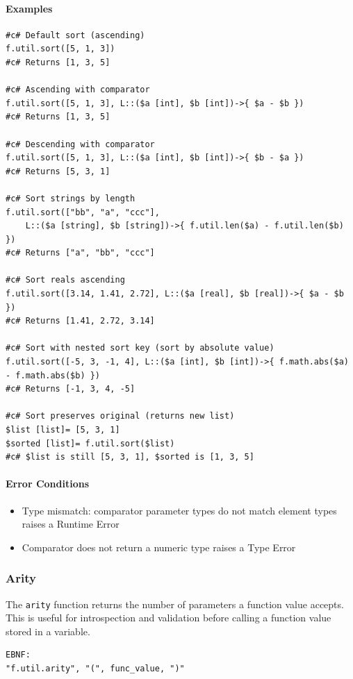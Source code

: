 \paragraph{Examples}
\begin{verbatim}
#c# Default sort (ascending)
f.util.sort([5, 1, 3])
#c# Returns [1, 3, 5]

#c# Ascending with comparator
f.util.sort([5, 1, 3], L::($a [int], $b [int])->{ $a - $b })
#c# Returns [1, 3, 5]

#c# Descending with comparator
f.util.sort([5, 1, 3], L::($a [int], $b [int])->{ $b - $a })
#c# Returns [5, 3, 1]

#c# Sort strings by length
f.util.sort(["bb", "a", "ccc"],
    L::($a [string], $b [string])->{ f.util.len($a) - f.util.len($b) })
#c# Returns ["a", "bb", "ccc"]

#c# Sort reals ascending
f.util.sort([3.14, 1.41, 2.72], L::($a [real], $b [real])->{ $a - $b })
#c# Returns [1.41, 2.72, 3.14]

#c# Sort with nested sort key (sort by absolute value)
f.util.sort([-5, 3, -1, 4], L::($a [int], $b [int])->{ f.math.abs($a) - f.math.abs($b) })
#c# Returns [-1, 3, 4, -5]

#c# Sort preserves original (returns new list)
$list [list]= [5, 3, 1]
$sorted [list]= f.util.sort($list)
#c# $list is still [5, 3, 1], $sorted is [1, 3, 5]
\end{verbatim}

\paragraph{Error Conditions}
\begin{itemize}
\item Type mismatch: comparator parameter types do not match element types raises a Runtime Error
\item Comparator does not return a numeric type raises a Type Error
\end{itemize}

\subsubsection{Arity}
The \texttt{arity} function returns the number of parameters a function value accepts. This is useful for introspection and validation before calling a function value stored in a variable.
\begin{verbatim}
EBNF:
"f.util.arity", "(", func_value, ")"
\end{verbatim}

